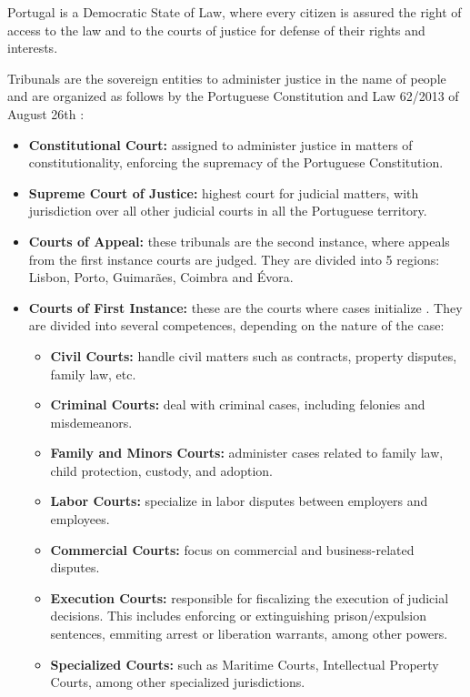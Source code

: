 \documentclass[11pt,a4paper,twoside,openright]{book}
\begin{document}
Portugal is a Democratic State of Law, where every citizen is assured the right of access to the law and to the courts of justice for defense of their rights and interests.

\par Tribunals are the sovereign entities to administer justice in the name of people and are organized as follows by the Portuguese Constitution and Law 62/2013 of August 26th \parencite{noauthor_lei_nodate,noauthor_dgpj_nodate}:

\begin{itemize}
    \item \textbf{Constitutional Court:} assigned to administer justice in matters of constitutionality, enforcing the supremacy of the Portuguese Constitution.
    \item \textbf{Supreme Court of Justice:} highest court for judicial matters, with jurisdiction over all other judicial courts in all the Portuguese territory.
    \item   \textbf{Courts of Appeal:} these tribunals are the second instance, where appeals from the first instance courts are judged. They are divided into 5 regions: Lisbon, Porto, Guimarães, Coimbra and Évora.
    \item \textbf{Courts of First Instance:} these are the courts where cases initialize . They are divided into several competences, depending on the nature of the case:
            \begin{itemize}
                \item \textbf{Civil Courts:} handle civil matters such as contracts, property disputes, family law, etc.
                \item \textbf{Criminal Courts:} deal with criminal cases, including felonies and misdemeanors.
                \item \textbf{Family and Minors Courts:} administer cases related to family law, child protection, custody, and adoption.
                \item \textbf{Labor Courts:} specialize in labor disputes between employers and employees.
                \item \textbf{Commercial Courts:} focus on commercial and business-related disputes.
                \item \textbf{Execution Courts:} responsible for fiscalizing the execution of judicial decisions. This includes enforcing or extinguishing prison/expulsion sentences, emmiting arrest or liberation warrants, among other powers.
                \item \textbf{Specialized Courts:} such as Maritime Courts, Intellectual Property Courts, among other specialized jurisdictions.
            \end{itemize}
    \end{itemize}
\end{document}
